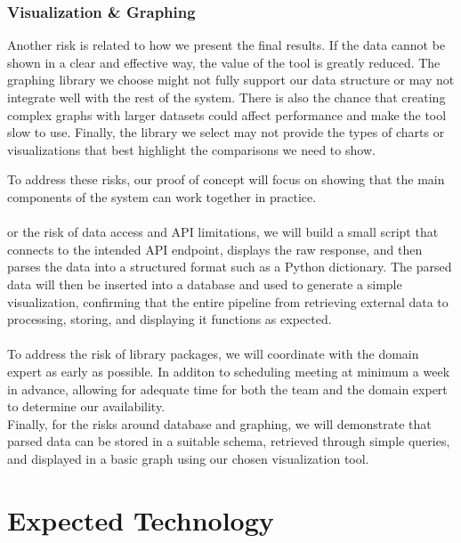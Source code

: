 \documentclass{article}
\begin{document}
\subsubsection*{Visualization \& Graphing}\vspace{-0.5em}
Another risk is related to how we present the final results. If the data cannot be shown in a clear and effective way, the value of the tool is greatly reduced. The graphing library we choose might not fully support our data structure or may not integrate well with the rest of the system. There is also the chance that creating complex graphs with larger datasets could affect performance and make the tool slow to use. Finally, the library we select may not provide the types of charts or visualizations that best highlight the comparisons we need to show.


\vspace{1em} %
\noindent
To address these risks, our proof of concept will focus on showing that the main components of the system can work together in practice. \\\\
or the risk of data access and API limitations, we will build a small script that connects to the intended API endpoint, displays the raw response, and then parses the data into a structured format such as a Python dictionary. The parsed data will then be inserted into a database and used to generate a simple visualization, confirming that the entire pipeline from retrieving external data to processing, storing, and displaying it functions as expected. \\\\
To address the risk of library packages, we will coordinate with the domain expert as early as possible. In additon to scheduling meeting at minimum a week in advance, allowing for adequate time for both the team and the domain expert to determine our availability.\\
Finally, for the risks around database and graphing, we will demonstrate that parsed data can be stored in a suitable schema, retrieved through simple queries, and displayed in a basic graph using our chosen visualization tool.
\section{Expected Technology}
\end{document}
